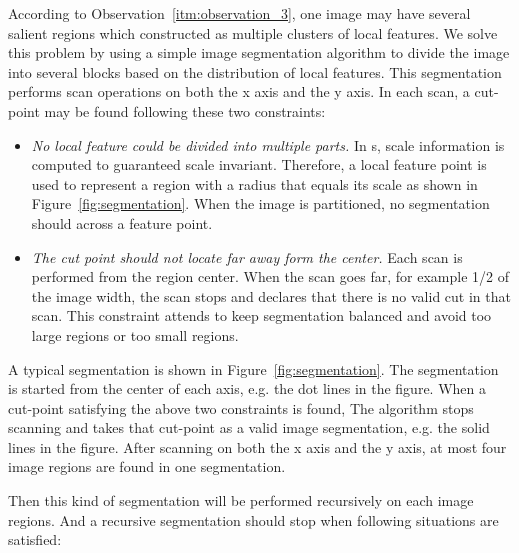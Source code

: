 According to Observation~\ref{itm:observation_3}, one image may have several salient regions which constructed as multiple clusters of local features. We solve this problem by using a simple image segmentation algorithm to divide the image into several blocks based on the distribution of local features. This segmentation performs scan operations on both the x axis and the y axis. In each scan, a cut-point may be found following these two constraints:

\begin{itemize}

  \item \textit{No local feature could be divided into multiple parts.} In {\lfea}s, scale information is computed to guaranteed scale invariant. Therefore, a local feature point is used to represent a region with a radius that equals its scale as shown in Figure~\ref{fig:segmentation}. When the image is partitioned, no segmentation should across a feature point.

  \item \textit{The cut point should not locate far away form the center.} Each scan is performed from the region center. When the scan goes far, for example 1/2 of the image width, the scan stops and declares that there is no valid cut in that scan. This constraint attends to keep segmentation balanced and avoid too large regions or too small regions.

\end{itemize}

A typical segmentation is shown in Figure~\ref{fig:segmentation}. The segmentation is started from the center of each axis, e.g. the dot lines in the figure. When a cut-point satisfying the above two constraints is found, The algorithm stops scanning and takes that cut-point as a valid image segmentation, e.g. the solid lines in the figure. After scanning on both the x axis and the y axis, at most four image regions are found in one segmentation.

Then this kind of segmentation will be performed recursively on each image regions. And a recursive segmentation should stop when following situations are satisfied:

